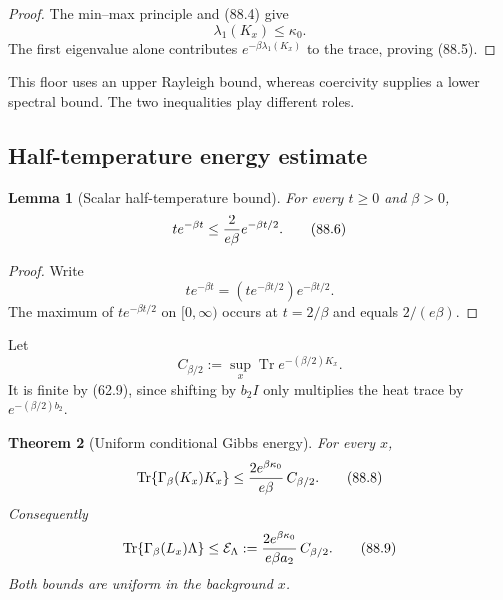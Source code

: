 \documentclass[11pt]{article}
\newtheorem{theorem}{Theorem}[section]
\newtheorem{lemma}[theorem]{Lemma}
\theoremstyle{remark}
\begin{document}
\begin{proof}
The min--max principle and (88.4) give
\[
                         \lambda_1(K_x)\leq\kappa_0.
\]
The first eigenvalue alone contributes
\(e^{-\beta\lambda_1(K_x)}\) to the trace, proving (88.5).
\end{proof}

This floor uses an upper Rayleigh bound, whereas coercivity supplies
a lower spectral bound.  The two inequalities play different roles.

\subsection{Half-temperature energy estimate}

\begin{lemma}[Scalar half-temperature bound]
\label{lem:v12v88-scalar}
For every \(t\geq0\) and \(\beta>0\),
\begin{equation}
                         t e^{-\beta t}
 \leq {2\over e\beta}e^{-\beta t/2}.                        \tag{88.6}
\end{equation}
\end{lemma}

\begin{proof}
Write
\[
 t e^{-\beta t}
 =\left(t e^{-\beta t/2}\right)e^{-\beta t/2}.
\]
The maximum of \(t e^{-\beta t/2}\) on \([0,\infty)\) occurs at
\(t=2/\beta\) and equals \(2/(e\beta)\).
\end{proof}

Let
\begin{equation}
 C_{\beta/2}
 :=\sup_x\operatorname{Tr}e^{-(\beta/2)K_x}.                \tag{88.7}
\end{equation}
It is finite by (62.9), since shifting by \(b_2I\) only multiplies
the heat trace by \(e^{-(\beta/2)b_2}\).

\begin{theorem}[Uniform conditional Gibbs energy]
\label{thm:v12v88-Gibbs-energy}
For every \(x\),
\begin{equation}
 \operatorname{Tr}\{\Gamma_\beta(K_x)K_x\}
 \leq
 {2e^{\beta\kappa_0}\over e\beta}\,C_{\beta/2}.              \tag{88.8}
\end{equation}
Consequently
\begin{equation}
 \operatorname{Tr}\{\Gamma_\beta(L_x)\Lambda\}
 \leq
 {\cal E}_\Lambda
 :=
 {2e^{\beta\kappa_0}\over
  e\beta a_2}\,C_{\beta/2}.                                 \tag{88.9}
\end{equation}
Both bounds are uniform in the background \(x\).
\end{theorem}
\end{document}

